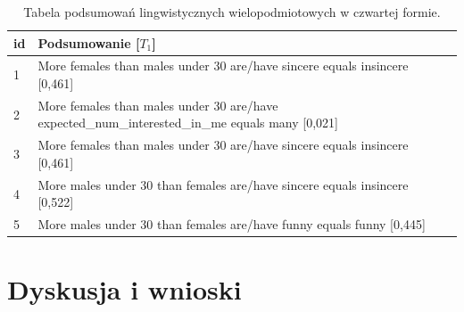 \documentclass{classrep}
\begin{document}
\begin{center}
  \begin{table}[H]
    \begin{tabularx}{\textwidth}{lXc}
    
    id & Podsumowanie [$T_1$] \\ \hline 
  
    1 & More females than males under 30 are/have sincere equals insincere [0,461] \\\hline
    2 & More females than males under 30 are/have expected\_num\_interested\_in\_me equals many [0,021] \\  \hline
    3 & More females than males under 30 are/have sincere equals insincere [0,461]\\ \hline
    4 & More males under 30 than females are/have sincere equals insincere [0,522]\\ \hline
    5 & More males under 30 than females are/have funny equals funny [0,445]\\ \hline
  \end{tabularx}
  \caption{Tabela podsumowań lingwistycznych wielopodmiotowych w czwartej formie.}
\end{table}
\end{center}





% 
% 
% 

\section{Dyskusja i wnioski}
\end{document}
